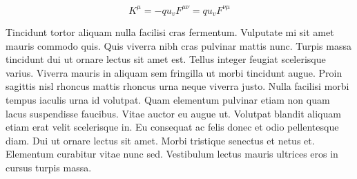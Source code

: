\documentclass{article}
\begin{document}
    \begin{equation}
    	K^\mu =-qu_vF^{\mu \nu }=qu_vF^{\nu \mu }
    \end{equation}
    
    Tincidunt tortor aliquam nulla facilisi cras fermentum. Vulputate mi sit amet mauris commodo quis. Quis viverra nibh cras pulvinar mattis nunc. Turpis massa tincidunt dui ut ornare lectus sit amet est. Tellus integer feugiat scelerisque varius. Viverra mauris in aliquam sem fringilla ut morbi tincidunt augue. Proin sagittis nisl rhoncus mattis rhoncus urna neque viverra justo. Nulla facilisi morbi tempus iaculis urna id volutpat. Quam elementum pulvinar etiam non quam lacus suspendisse faucibus. Vitae auctor eu augue ut. Volutpat blandit aliquam etiam erat velit scelerisque in. Eu consequat ac felis donec et odio pellentesque diam. Dui ut ornare lectus sit amet. Morbi tristique senectus et netus et. Elementum curabitur vitae nunc sed. Vestibulum lectus mauris ultrices eros in cursus turpis massa.
    
\end{document}
